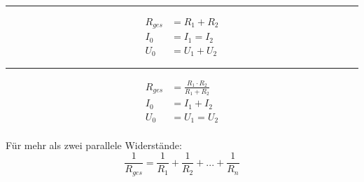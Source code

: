 \documentclass{article}
\begin{document}
\begin{mdframed}
\vspace{0.2\baselineskip}
\\
\vspace{0.6\baselineskip}
\begin{minipage}{0.25\textwidth}
\vspace{0.5\baselineskip}
\vspace{0.2\baselineskip}
\rule{\textwidth-30pt}{0.5pt}
\begin{align*}
R_{ges} &= R_1 + R_2 \\
I_0 &= I_1 = I_2 \\
U_0 &= U_1 + U_2
\end{align*}
\end{minipage}
\raisebox{-0.5\height}{}
\hspace{0.2\baselineskip}
\vrule
\hspace{0.2\baselineskip}
\raisebox{-0.5\height}{}
\begin{minipage}{0.25\textwidth}
\vspace{0.5\baselineskip}
\vspace{0.2\baselineskip}
\rule{\textwidth-30pt}{0.5pt}
\begin{align*}
R_{ges} &= \frac{R_1 \cdot R_2}{R_1 + R_2} \\
I_0 &= I_1 + I_2 \\
U_0 &= U_1 = U_2
\end{align*}
\vspace{0\baselineskip}\\
Für mehr als zwei parallele Widerstände:
\[\frac{1}{R_{ges}} = \frac{1}{R_1} + \frac{1}{R_2} + ... + \frac{1}{R_n}\]
\hspace{0.2\baselineskip}
\end{minipage}\\
\vspace{0.8\baselineskip}
\end{mdframed}
\end{document}
